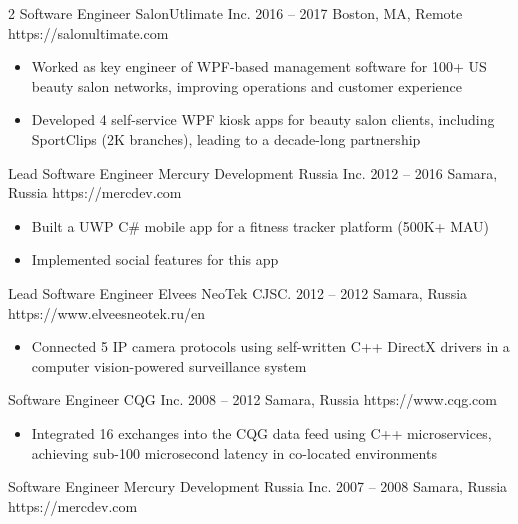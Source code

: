 \documentclass[9pt,a4paper]{igrmkcv}
\begin{document}
\begin{paracol}{2}
    \cvLeftEvent
        {Software Engineer}
        {SalonUtlimate Inc.}
        {2016 -- 2017}
        {Boston, MA, Remote}
        {https://salonultimate.com}

        \begin{itemize}
            \item Worked as key engineer of WPF-based management software
                  for 100+ US beauty salon networks, improving operations and customer experience
            \item Developed 4 self-service WPF kiosk apps for beauty salon clients,
                  including SportClips (2K branches), leading to a decade-long partnership
        \end{itemize}

    \cvLeftEvent
        {Lead Software Engineer}
        {Mercury Development Russia Inc.}
        {2012 -- 2016}
        {Samara, Russia}
        {https://mercdev.com}

        \begin{itemize}
            \item Built a UWP C\# mobile app for a fitness tracker platform (500K+ MAU)
            \item Implemented social features for this app
        \end{itemize}

    \cvLeftEvent
        {Lead Software Engineer}
        {Elvees NeoTek CJSC.}
        {2012 -- 2012}
        {Samara, Russia}
        {https://www.elveesneotek.ru/en}

        \begin{itemize}
            \item Connected 5 IP camera protocols using self-written C++ DirectX drivers
                  in a computer vision-powered surveillance system
        \end{itemize}

    \cvLeftEvent
        {Software Engineer}
        {CQG Inc.}
        {2008 -- 2012}
        {Samara, Russia}
        {https://www.cqg.com}

        \begin{itemize}
            \item Integrated 16 exchanges into the CQG data feed using C++ microservices,
                  achieving sub-100 microsecond latency in co-located environments
        \end{itemize}

    \cvLeftEvent
        {Software Engineer}
        {Mercury Development Russia Inc.}
        {2007 -- 2008}
        {Samara, Russia}
        {https://mercdev.com}


\end{paracol}
\end{document}

